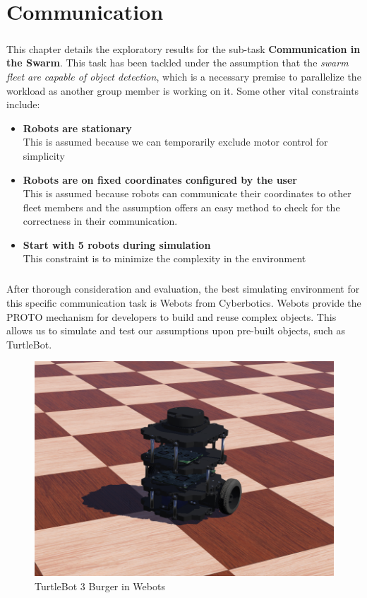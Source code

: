 \chapter{Communication}

\paragraph*{}
This chapter details the exploratory results for the sub-task \textbf{Communication in the Swarm}. This task has been tackled under the assumption that the \textit{swarm fleet are capable of object detection}, which is a necessary premise to parallelize the workload as another group member is working on it. Some other vital constraints include:

\begin{itemize}
    \item \textbf{Robots are stationary} \\
    This is assumed because we can temporarily exclude motor control for simplicity
    \item \textbf{Robots are on fixed coordinates configured by the user} \\
    This is assumed because robots can communicate their coordinates to other fleet members and the assumption offers an easy method to check for the correctness in their communication.
    \item \textbf{Start with 5 robots during simulation} \\
    This constraint is to minimize the complexity in the environment
\end{itemize}

\paragraph*{}
After thorough consideration and evaluation, the best simulating environment for this specific communication task is Webots from Cyberbotics. Webots provide the PROTO mechanism for developers to build and reuse complex objects. This allows us to simulate and test our assumptions upon pre-built objects, such as 
TurtleBot. 

\begin{figure}[H]
    \centering
    \includegraphics[width=0.4\linewidth]{assets/images/communication/environment/turtlebot.png}
    \caption{TurtleBot 3 Burger in Webots}
    \label{fig:turtlebot}
\end{figure}

